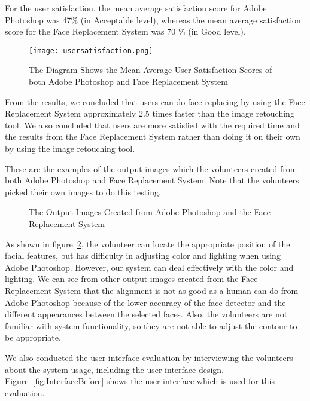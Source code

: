 For the user satisfaction, the mean average satisfaction score for Adobe Photoshop was 47\% (in Acceptable level), whereas the mean average satisfaction score for the Face Replacement System was 70 \% (in Good level).

\begin{figure}[htb]
   \centering
   \texttt{[image: usersatisfaction.png]}
   \caption{The Diagram Shows the Mean Average User Satisfaction Scores of both Adobe Photoshop and Face Replacement System}
   \label{fig:UserSatisfaction}
\end{figure}

From the results, we concluded that users can do face replacing by using the Face Replacement System approximately 2.5 times faster than the image retouching tool. We also concluded that users are more satisfied with the required time and the results from the Face Replacement System rather than doing it on their own by using the image retouching tool.

These are the examples of the output images which the volunteers created from both Adobe Photoshop and Face Replacement System. Note that the volunteers picked their own images to do this testing.

\begin{figure}[htb]
  \centering
  \caption{The Output Images Created from Adobe Photoshop and the Face Replacement System}
  \label{fig:OutputImages}
\end{figure}

As shown in figure~\ref{fig:OutputImages}, the volunteer can locate the appropriate position of the facial features, but has difficulty in adjusting color and lighting when using Adobe Photoshop. However, our system can deal effectively with the color and lighting. We can see from other output images created from the Face Replacement System that the alignment is not as good as a human can do from Adobe Photoshop because of the lower accuracy of the face detector and the different appearances between the selected faces. Also, the volunteers are not familiar with system functionality, so they are not able to adjust the contour to be appropriate.

We also conducted the user interface evaluation by interviewing the volunteers about the system usage, including the user interface design. Figure~\ref{fig:InterfaceBefore} shows the user interface which is used for this evaluation.


